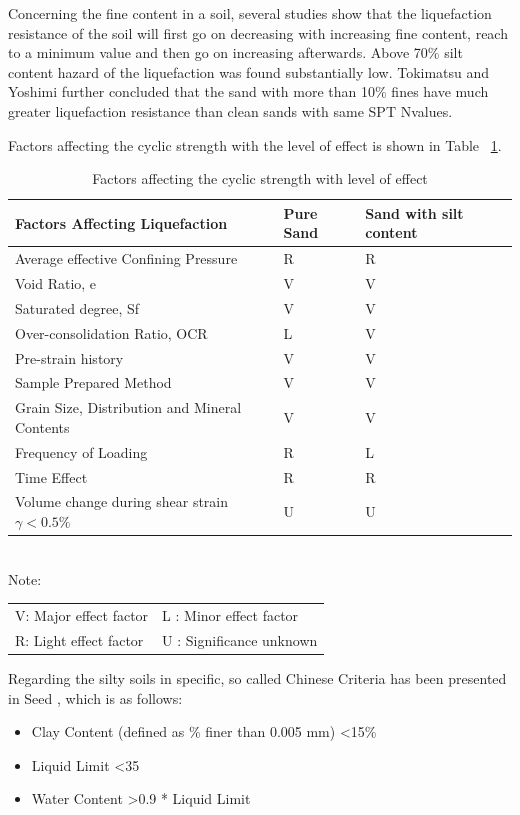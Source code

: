 Concerning the fine content in a soil, several studies show that the liquefaction resistance of the soil will first go on decreasing with increasing fine content, reach to a minimum value and then go on increasing afterwards. Above 70\% silt content hazard of the liquefaction was found substantially low.\cite{r14} Tokimatsu and Yoshimi further concluded that the sand with more than 10\% fines have much greater liquefaction resistance than clean sands with same SPT N\-values.\cite{r17}

Factors affecting the cyclic strength with the level of effect is shown in Table ~\ref{fac-tab}. \cite{r13}
\begin{table}[!hbt]
\label{fac-tab}
\caption{Factors affecting the cyclic strength with level of effect}
\begin{tabularx}{\textwidth}{ |X|X|X| }
\hline
Factors Affecting Liquefaction & Pure Sand & Sand with silt content \\
\hline
Average effective Confining Pressure & R & R \\
\hline
Void Ratio, e & V & V \\
\hline
Saturated degree, Sf & V & V \\
\hline
Over-consolidation Ratio, OCR & L & V\\
\hline
Pre-strain history & V & V\\
\hline
Sample Prepared Method & V & V\\
\hline
Grain Size, Distribution and Mineral Contents & V & V \\
\hline
Frequency of Loading & R & L \\
\hline
Time Effect & R & R \\
\hline
Volume change during shear strain \(\gamma < 0.5 \%\) & U & U \\
\hline
\end{tabularx}
\end{table}
\\
Note:\\
\begin{tabular}{l l}
V: Major effect factor & L : Minor effect factor\\
R: Light effect factor & U : Significance unknown
\end{tabular}

Regarding the silty soils in specific, so called Chinese Criteria \cite{r20} has been presented in Seed  \cite{r12} , which is as follows:

\begin{itemize}
\item Clay Content (defined as \% finer than 0.005 mm) \textless 15\%
\item Liquid Limit \textless  35
\item Water Content \textgreater 0.9 * Liquid Limit
\end{itemize}

